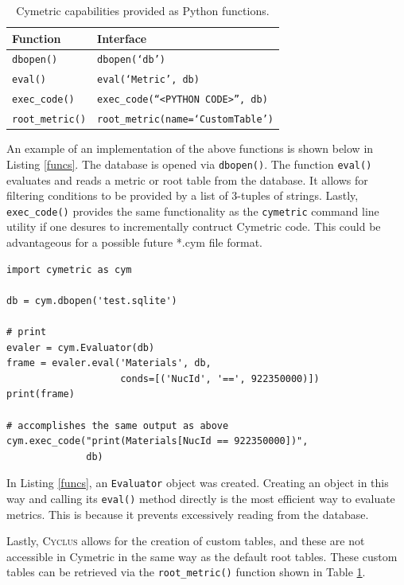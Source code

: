 \documentclass{anstrans}
\newcommand{\cyclus}{\textsc{Cyclus}\xspace}
\newcommand{\code}[1]{{\color{code}\texttt{#1}}}
\begin{document}
\begin{table}[htb]
\centering
\caption{Cymetric capabilities provided as Python functions.}
\begin{tabular}{ll}
\toprule
  Function           & Interface                 \\
\midrule 
  \code{dbopen()}    & \code{dbopen(`db')}         \\
  \code{eval()}      & \code{eval(`Metric', db)}   \\
  \code{exec\_code()} & \code{exec\_code(``<PYTHON CODE>'', db)}  \\ 
  \code{root\_metric()} & \code{root\_metric(name=`CustomTable')}  \\
\bottomrule
\end{tabular}
\label{tab:pyfunc}
\end{table} 

An example of an implementation of the above functions is shown below in 
Listing \ref{funcs}. The database is opened via \code{dbopen()}. The 
function \code{eval()} evaluates and reads a metric or root table from the 
database. It allows for filtering conditions to be provided by a list of 
3-tuples of strings. 
Lastly, \code{exec\_code()} provides the same functionality as the
\code{cymetric} command line utility if one desures to incrementally contruct Cymetric code. This could be advantageous for a possible future *.cym file format.

\begin{lstlisting}[caption ={Example Python Script Using Cymetric}, label=funcs]
import cymetric as cym

db = cym.dbopen('test.sqlite')

# print 
evaler = cym.Evaluator(db)
frame = evaler.eval('Materials', db, 
                    conds=[('NucId', '==', 922350000)])
print(frame)

# accomplishes the same output as above
cym.exec_code("print(Materials[NucId == 922350000])", 
              db)
\end{lstlisting}

In Listing \ref{funcs}, an \code{Evaluator} object was created. 
Creating an object in this way and calling its \code{eval()} method directly 
is the most efficient way to evaluate metrics. This is because
it prevents excessively reading from the database.

Lastly, \cyclus allows for the creation of custom tables, and these are not accessible in Cymetric in the same way as the default root tables. These custom tables can be retrieved via the \code{root\_metric()} function shown in Table \ref{tab:pyfunc}.
\end{document}
